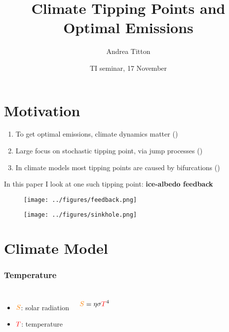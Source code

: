 \documentclass[pdf]{beamer}
\author{Andrea Titton}
\title[Climate Tipping Points and Optimal Emissions]{\small Climate Tipping Points and\\ Optimal Emissions}
\institute{CeNDEF, University of Amsterdam}
\date{TI seminar, 17 November}
\begin{document}
\frame[plain]{\titlepage}

\section{Motivation}
\begin{frame}
    \begin{enumerate}
        \item To get optimal emissions, climate dynamics matter (\cite{dietz_are_2020, dietz_economic_2021})
        \pause \item Large focus on stochastic tipping point, via jump processes (\cite{van_den_bremer_risk-adjusted_2021,lin_social_2023})
        \pause \item In climate models most tipping points are caused by bifurcations (\cite{ashwin_tipping_2012,ashwin_extreme_2020})
    \end{enumerate}
\end{frame}

\begin{frame}
    In this paper I look at one such tipping point: \textbf{ice-albedo feedback}

    \pause \begin{figure}
        \centering
        \texttt{[image: ../figures/feedback.png]}
    \end{figure}
\end{frame}


\begin{frame}
    \centering
    \begin{figure}
        \texttt{[image: ../figures/sinkhole.png]}
    \end{figure}
\end{frame}


\section{Climate Model}

\begin{frame} \frametitle{Temperature}
    \begin{columns}
        \begin{itemize}
            \item ${\color{orange} S}$: solar radiation
            \item ${\color{red} T}$: temperature
        \end{itemize}
        \begin{equation*}
            {\color{orange} S} = \eta \sigma {\color{red} T}^4
        \end{equation*}
    \end{columns}
\end{frame}
\end{document}
